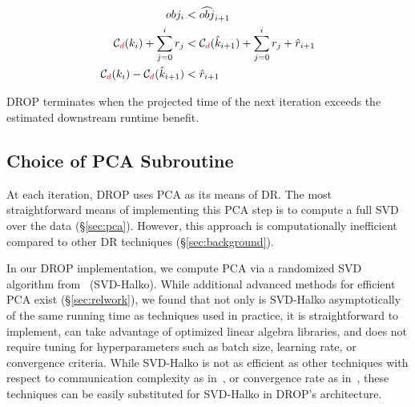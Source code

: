 \vspace{-.4cm}
\begin{align}
  obj_i &< \widehat{obj}_{i+1} \nonumber \\
  \mathcal{C}_{\color{red}d}(k_i) + \sum_{j=0}^i r_j &< \mathcal{C}_{\color{red}d}(\hat{k}_{i+1}) + \sum_{j=0}^{i} r_j + \hat{r}_{i+1} \nonumber \\
  \mathcal{C}_{\color{red}d}(k_i) - \mathcal{C}_{\color{red}d}(\hat{k}_{i+1}) &< \hat{r}_{i+1}  \label{eq:check}
\end{align}

DROP terminates when the projected time of the next iteration exceeds the estimated downstream runtime benefit. 

\subsection{Choice of PCA Subroutine}
\label{subsec:pcaroutine}

At each iteration, DROP uses PCA as its means of DR.
The most straightforward means of implementing this PCA step is to compute a full SVD over the data (\S\ref{sec:pca}).
However, this approach is computationally inefficient compared to other DR techniques (\S\ref{sec:background}).  

In our DROP implementation, we compute PCA via a randomized SVD algorithm from~\cite{tropp} (SVD-Halko). 
While additional advanced methods for efficient PCA exist (\S\ref{sec:relwork}), we found that not only is SVD-Halko asymptotically of the same running time as techniques used in practice, it is straightforward to implement, can take advantage of optimized linear algebra libraries, and does not require tuning for hyperparameters such as batch size, learning rate, or convergence criteria.  
While SVD-Halko is not as efficient as other techniques with respect to communication complexity as in~\cite{ppca-sigmod}, or convergence rate as in~\cite{re-new}, these techniques can be easily substituted for SVD-Halko in DROP's architecture.

